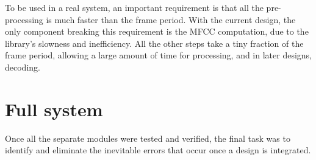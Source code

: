 	To be used in a real system, an important requirement is that all the pre-processing is much faster than the frame period.  With the current design, the only component breaking this requirement is the MFCC computation, due to the library's slowness and inefficiency.  All the other steps take a tiny fraction of the frame period, allowing a large amount of time for processing, and in later designs, decoding.


\section{Full system} %
\label{sec:full_system_testing}
	Once all the separate modules were tested and verified, the final task was to identify and eliminate the inevitable errors that occur once a design is integrated.



